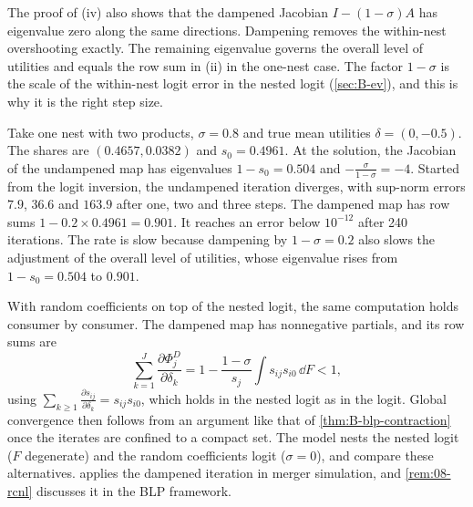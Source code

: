 The proof of (iv) also shows that the dampened Jacobian $I - (1 - \sigma)A$ has eigenvalue zero along the
same directions. Dampening removes the within-nest overshooting exactly. The remaining eigenvalue governs
the overall level of utilities and equals the row sum in (ii) in the one-nest case. The factor $1 - \sigma$
is the scale of the within-nest logit error in the nested logit (\cref{sec:B-ev}), and this is why it is the
right step size.

\begin{example}\label{ex:B-nl-dampening}
Take one nest with two products, $\sigma = 0.8$ and true mean utilities $\delta = (0, -0.5)$. The shares are
$(0.4657, 0.0382)$ and $s_0 = 0.4961$. At the solution, the Jacobian of the undampened map has eigenvalues
$1 - s_0 = 0.504$ and $-\frac{\sigma}{1-\sigma} = -4$. Started from the logit inversion, the undampened iteration
diverges, with sup-norm errors $7.9$, $36.6$ and $163.9$ after one, two and three steps. The dampened map has
row sums $1 - 0.2 \times 0.4961 = 0.901$. It reaches an error below $10^{-12}$ after 240 iterations. The rate is
slow because dampening by $1 - \sigma = 0.2$ also slows the adjustment of the overall level of utilities, whose
eigenvalue rises from $1 - s_0 = 0.504$ to $0.901$.
\end{example}

\begin{remark}\label{rem:B-rcnl}
With random coefficients on top of the nested logit, the same computation holds consumer by consumer. The
dampened map has nonnegative partials, and its row sums are
\begin{equation*}
  \sum_{k=1}^{J}\frac{\partial\Phi^D_j}{\partial\delta_k} = 1 - \frac{1 - \sigma}{s_j}\int s_{ij}s_{i0}\,\dd F <
  1,
\end{equation*}
using $\sum_{k \geq 1}\frac{\partial s_{ij}}{\partial\delta_k} = s_{ij}s_{i0}$, which holds in the nested logit
as in the logit. Global convergence then follows from an argument like that of \cref{thm:B-blp-contraction}
once the iterates are confined to a compact set. The model nests the nested logit ($F$ degenerate) and the
random coefficients logit ($\sigma = 0$), and \citet{GrigolonVerboven2014} compare these alternatives.
 applies the dampened iteration in merger simulation, and \cref{rem:08-rcnl} discusses it in the
BLP framework.
\end{remark}

